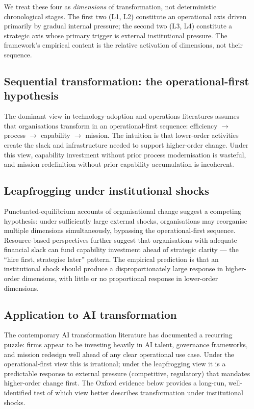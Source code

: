 \documentclass[11pt]{article}
\begin{document}
We treat these four as \emph{dimensions} of transformation, not deterministic chronological stages. The first two (L1, L2) constitute an operational axis driven primarily by gradual internal pressure; the second two (L3, L4) constitute a strategic axis whose primary trigger is external institutional pressure. The framework's empirical content is the relative activation of dimensions, not their sequence.

\subsection{Sequential transformation: the operational-first hypothesis}

The dominant view in technology-adoption and operations literatures assumes that organisations transform in an operational-first sequence: efficiency $\rightarrow$ process $\rightarrow$ capability $\rightarrow$ mission. The intuition is that lower-order activities create the slack and infrastructure needed to support higher-order change. Under this view, capability investment without prior process modernisation is wasteful, and mission redefinition without prior capability accumulation is incoherent.

\subsection{Leapfrogging under institutional shocks}

Punctuated-equilibrium accounts of organisational change suggest a competing hypothesis: under sufficiently large external shocks, organisations may reorganise multiple dimensions simultaneously, bypassing the operational-first sequence. Resource-based perspectives further suggest that organisations with adequate financial slack can fund capability investment ahead of strategic clarity --- the ``hire first, strategise later'' pattern. The empirical prediction is that an institutional shock should produce a disproportionately large response in higher-order dimensions, with little or no proportional response in lower-order dimensions.

\subsection{Application to AI transformation}

The contemporary AI transformation literature has documented a recurring puzzle: firms appear to be investing heavily in AI talent, governance frameworks, and mission redesign well ahead of any clear operational use case. Under the operational-first view this is irrational; under the leapfrogging view it is a predictable response to external pressure (competitive, regulatory) that mandates higher-order change first. The Oxford evidence below provides a long-run, well-identified test of which view better describes transformation under institutional shocks.
\end{document}
